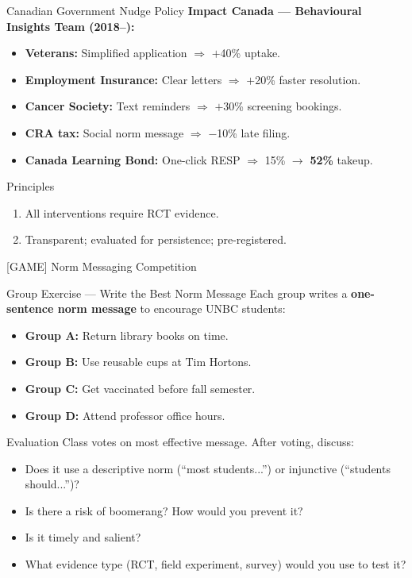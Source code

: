 \documentclass[aspectratio=169]{beamer}
\begin{document}
\begin{frame}{Canadian Government Nudge Policy}
\textcolor{beblue}{\textbf{Impact Canada --- Behavioural Insights Team (2018--):}}
\begin{itemize}\small
  \item \textbf{Veterans:} Simplified application $\Rightarrow$ $+$40\% uptake.
  \item \textbf{Employment Insurance:} Clear letters $\Rightarrow$ $+$20\% faster resolution.
  \item \textbf{Cancer Society:} Text reminders $\Rightarrow$ $+$30\% screening bookings.
  \item \textbf{CRA tax:} Social norm message $\Rightarrow$ $-$10\% late filing.
  \item \textbf{Canada Learning Bond:} One-click RESP $\Rightarrow$ 15\% $\to$ \textbf{52\%} takeup.
\end{itemize}
\begin{alertblock}{Principles}
\begin{enumerate}\small
  \item All interventions require RCT evidence.
  \item Transparent; evaluated for persistence; pre-registered.
\end{enumerate}
\end{alertblock}
\end{frame}

\begin{frame}{[GAME] Norm Messaging Competition}
\begin{alertblock}{Group Exercise --- Write the Best Norm Message}
Each group writes a \textbf{one-sentence norm message} to encourage UNBC students:
\begin{itemize}
  \item \textbf{Group A:} Return library books on time.
  \item \textbf{Group B:} Use reusable cups at Tim Hortons.
  \item \textbf{Group C:} Get vaccinated before fall semester.
  \item \textbf{Group D:} Attend professor office hours.
\end{itemize}
\end{alertblock}
\begin{block}{Evaluation}
Class votes on most effective message. After voting, discuss:
\begin{itemize}
  \item Does it use a descriptive norm (``most students...'') or injunctive (``students should...'')?
  \item Is there a risk of boomerang? How would you prevent it?
  \item Is it timely and salient?
  \item What evidence type (RCT, field experiment, survey) would you use to test it?
\end{itemize}
\end{block}
\end{frame}
\end{document}
